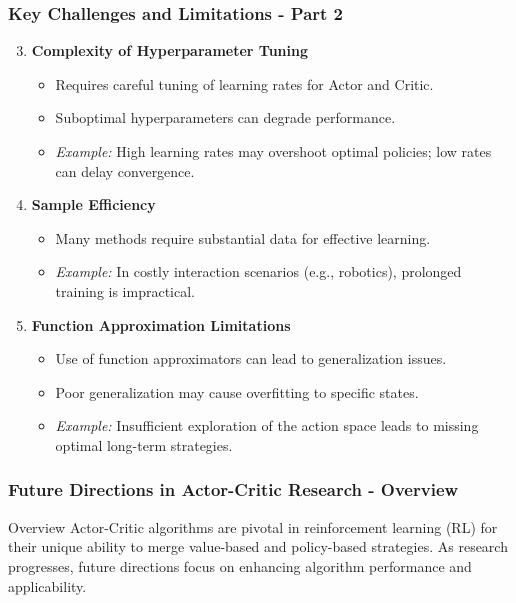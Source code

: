 \documentclass[aspectratio=169]{beamer}
\begin{document}
\begin{frame}[fragile]
    \frametitle{Key Challenges and Limitations - Part 2}

    \begin{enumerate}
        \setcounter{enumiii}{2} %
        \item \textbf{Complexity of Hyperparameter Tuning}
        \begin{itemize}
            \item Requires careful tuning of learning rates for Actor and Critic.
            \item Suboptimal hyperparameters can degrade performance.
            \item \textit{Example:} High learning rates may overshoot optimal policies; low rates can delay convergence.
        \end{itemize}

        \item \textbf{Sample Efficiency}
        \begin{itemize}
            \item Many methods require substantial data for effective learning.
            \item \textit{Example:} In costly interaction scenarios (e.g., robotics), prolonged training is impractical.
        \end{itemize}
        
        \item \textbf{Function Approximation Limitations}
        \begin{itemize}
            \item Use of function approximators can lead to generalization issues.
            \item Poor generalization may cause overfitting to specific states.
            \item \textit{Example:} Insufficient exploration of the action space leads to missing optimal long-term strategies.
        \end{itemize}
    \end{enumerate}

\end{frame}

\begin{frame}[fragile]
    \frametitle{Future Directions in Actor-Critic Research - Overview}
    \begin{block}{Overview}
        Actor-Critic algorithms are pivotal in reinforcement learning (RL) for their unique ability to merge value-based and policy-based strategies. As research progresses, future directions focus on enhancing algorithm performance and applicability.
    \end{block}
\end{frame}
\end{document}
